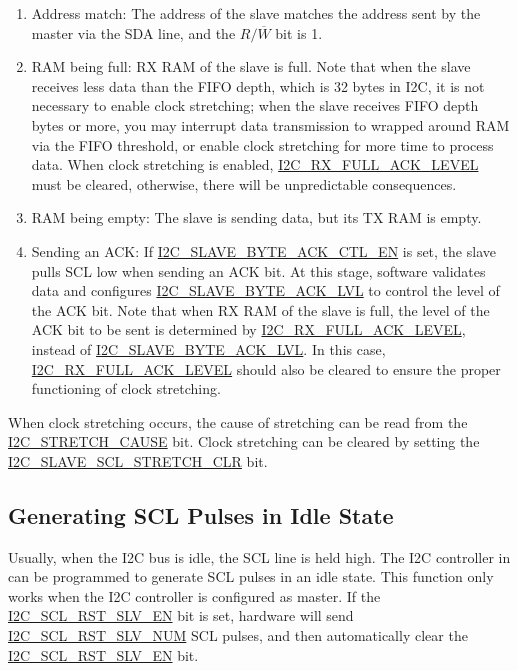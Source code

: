 \documentclass[main\_\_EN.tex]{subfiles}
\begin{document}
\begin{enumerate}
\item Address match: The address of the slave matches the address sent by the master via the SDA line, and the $R/\overline W$ bit is 1.
\item RAM being full: RX RAM of the slave is full. Note that when the slave receives less data than the FIFO depth, which is 32 bytes in \chipname{} I2C, it is not necessary to enable clock stretching; when the slave receives FIFO depth bytes or more, you may interrupt data transmission to wrapped around RAM via the FIFO threshold, or enable clock stretching for more time to process data. When clock stretching is enabled, \hyperref[fielddesc:I2CRXFULLACKLEVEL]{I2C\_RX\_FULL\_ACK\_LEVEL} must be cleared, otherwise, there will be unpredictable consequences.
\item RAM being empty: The slave is sending data, but its TX RAM is empty.
\item Sending an ACK: If \hyperref[fielddesc:I2CSLAVEBYTEACKCTLEN]{I2C\_SLAVE\_BYTE\_ACK\_CTL\_EN} is set, the slave pulls SCL low when sending an ACK bit. At this stage, software validates data and configures \hyperref[fielddesc:I2CSLAVEBYTEACKLVL]{I2C\_SLAVE\_BYTE\_ACK\_LVL} to control the level of the ACK bit. Note that when RX RAM of the slave is full, the level of the ACK bit to be sent is determined by \hyperref[fielddesc:I2CRXFULLACKLEVEL]{I2C\_RX\_FULL\_ACK\_LEVEL}, instead of \hyperref[fielddesc:I2CSLAVEBYTEACKLVL]{I2C\_SLAVE\_BYTE\_ACK\_LVL}. In this case, \hyperref[fielddesc:I2CRXFULLACKLEVEL]{I2C\_RX\_FULL\_ACK\_LEVEL} should also be cleared to ensure the proper functioning of clock stretching.
\end{enumerate}

When clock stretching occurs, the cause of stretching can be read from the \hyperref[fielddesc:I2CSTRETCHCAUSE]{I2C\_STRETCH\_CAUSE} bit. Clock stretching can be cleared by setting the \hyperref[fielddesc:I2CSLAVESCLSTRETCHCLR]{I2C\_SLAVE\_SCL\_STRETCH\_CLR} bit.

\subsection{Generating SCL Pulses in Idle State}
Usually, when the I2C bus is idle, the SCL line is held high. The I2C controller in \chipname{} can be programmed to generate SCL pulses in an idle state. This function only works when the I2C controller is configured as master. If the \hyperref[fielddesc:I2CSCLRSTSLVEN]{I2C\_SCL\_RST\_SLV\_EN} bit is set, hardware will send \hyperref[fielddesc:I2CSCLRSTSLVNUM]{I2C\_SCL\_RST\_SLV\_NUM} SCL pulses, and then automatically clear the \hyperref[fielddesc:I2CSCLRSTSLVEN]{I2C\_SCL\_RST\_SLV\_EN} bit. 
\end{document}
